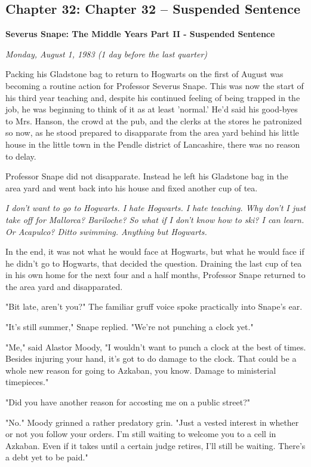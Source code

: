 \documentclass[a4paper,11pt]{article}
\begin{document}
\subsection{Chapter 32: Chapter 32 – Suspended Sentence}

\textbf{Severus Snape: The Middle Years Part II - Suspended Sentence}

\emph{Monday, August 1, 1983 (1 day before the last quarter)}

Packing his Gladstone bag to return to Hogwarts on the first of August was becoming a routine action for Professor Severus Snape. This was now the start of his third year teaching and, despite his continued feeling of being trapped in the job, he was beginning to think of it as at least 'normal.' He'd said his good-byes to Mrs. Hanson, the crowd at the pub, and the clerks at the stores he patronized so now, as he stood prepared to disapparate from the area yard behind his little house in the little town in the Pendle district of Lancashire, there was no reason to delay.

Professor Snape did not disapparate. Instead he left his Gladstone bag in the area yard and went back into his house and fixed another cup of tea.

\emph{I don't want to go to Hogwarts. I hate Hogwarts. I hate teaching. Why don't I just take off for Mallorca? Bariloche? So what if I don't know how to ski? I can learn. Or Acapulco? Ditto swimming. Anything but Hogwarts.}

In the end, it was not what he would face at Hogwarts, but what he would face if he didn't go to Hogwarts, that decided the question. Draining the last cup of tea in his own home for the next four and a half months, Professor Snape returned to the area yard and disapparated.

"Bit late, aren't you?" The familiar gruff voice spoke practically into Snape's ear.

"It's still summer," Snape replied. "We're not punching a clock yet."

"Me," said Alastor Moody, "I wouldn't want to punch a clock at the best of times. Besides injuring your hand, it's got to do damage to the clock. That could be a whole new reason for going to Azkaban, you know. Damage to ministerial timepieces."

"Did you have another reason for accosting me on a public street?"

"No." Moody grinned a rather predatory grin. "Just a vested interest in whether or not you follow your orders. I'm still waiting to welcome you to a cell in Azkaban. Even if it takes until a certain judge retires, I'll still be waiting. There's a debt yet to be paid."
\end{document}
